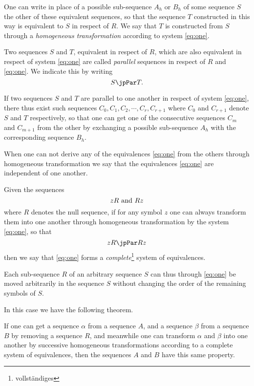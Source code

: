 One can write in place of a possible sub-sequence $A_h$ or $B_h$ of
some sequence $S$ the other of these equivalent sequences, so that the
sequence $T$ constructed in this way is equivalent to $S$ in respect
of $R$.  We say that $T$ is constructed from $S$ through a
\emph{homogeneous transformation} according to system \eqref{eq:one}.

Two sequences $S$ and $T$, equivalent in respect of $R$, which are
also equivalent in respect of system \eqref{eq:one} are called \emph{parallel}
sequences in respect of $R$ and \eqref{eq:one}.  We indicate this by writing 
$$S \jpPar T.$$

If two sequences $S$ and $T$ are parallel to one another in respect of
system \eqref{eq:one}, there thus exist such sequences $C_0, C_1, C_2, \cdots,
C_r, C_{r+1}$ where $C_0$ and $C_{r+1}$ denote $S$ and $T$
respectively, so that one can get one of the consecutive sequences $C_m$
and $C_{m+1}$ from the other by exchanging a possible sub-sequence
$A_h$ with the corresponding sequence $B_h$.

When one can not derive any of the equivalences \eqref{eq:one} from the others
through homogeneous transformation we say that the equivalences \eqref{eq:one}
are independent of one another.

\bigskip

Given the sequences
$$zR \hbox{ and } Rz$$
where $R$ denotes the null sequence, if for any symbol $z$ one can
always transform them into one another through homogeneous
transformation by the system \eqref{eq:one}, so that
$$zR \jpPar Rz$$
then we say that \eqref{eq:one} forms a
\emph{complete}\footnote{vollst\"andiges} system of equivalences.

Each sub-sequence $R$ of an arbitrary sequence $S$ can thus
through \eqref{eq:one} be moved arbitrarily in the sequence $S$
without changing the order of the remaining symbols of $S$.

In this case we have the following theorem.

\bigskip

If one can get a sequence $\alpha$ from a sequence $A$, and a sequence
$\beta$ from a sequence $B$ by removing a sequence $R$, and meanwhile
one can transform $\alpha$ and $\beta$ into one another by successive
homogeneous transformations according to a complete system of
equivalences, then the sequences $A$ and $B$ have this same property.

